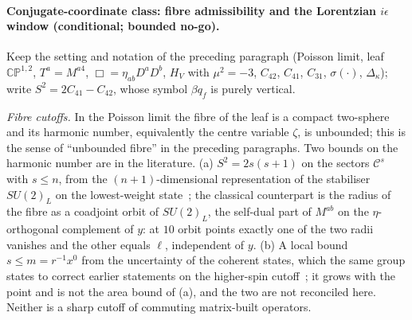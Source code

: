 \paragraph{Conjugate-coordinate class: fibre admissibility and the Lorentzian \(i\epsilon\) window (conditional; bounded no-go).}
Keep the setting and notation of the preceding paragraph (Poisson limit, leaf \(\mathbb{CP}^{1,2}\), \(T^a=M^{a4}\), \(\Box=\eta_{ab}D^aD^b\), \(H_V\) with \(\mu^2=-3\), \(C_{42}\), \(C_{41}\), \(C_{31}\), \(\sigma(\cdot)\), \(\Delta_\kappa\)); write \(S^2=2C_{41}-C_{42}\), whose symbol \(\beta q_f\) is purely vertical.

\emph{Fibre cutoffs.} In the Poisson limit the fibre of the leaf is a compact two-sphere and its harmonic number, equivalently the centre variable \(\zeta\), is unbounded; this is the sense of ``unbounded fibre'' in the preceding paragraphs. Two bounds on the harmonic number are in the literature. (a) \(S^2=2s(s+1)\) on the sectors \(\mathcal C^s\) with \(s\le n\), from the \((n+1)\)-dimensional representation of the stabiliser \(SU(2)_L\) on the lowest-weight state~\cite{Steinacker2019NoGhost}; the classical counterpart is the radius of the fibre as a coadjoint orbit of \(SU(2)_L\), the self-dual part of \(M^{ab}\) on the \(\eta\)-orthogonal complement of \(y\): at \(10\) orbit points exactly one of the two radii vanishes and the other equals \(\ell\), independent of \(y\). (b) A local bound \(s\le m=r^{-1}x^0\) from the uncertainty of the coherent states, which the same group states to correct earlier statements on the higher-spin cutoff~\cite{MantaSteinacker2025}; it grows with the point and is not the area bound of (a), and the two are not reconciled here. Neither is a sharp cutoff of commuting matrix-built operators.

